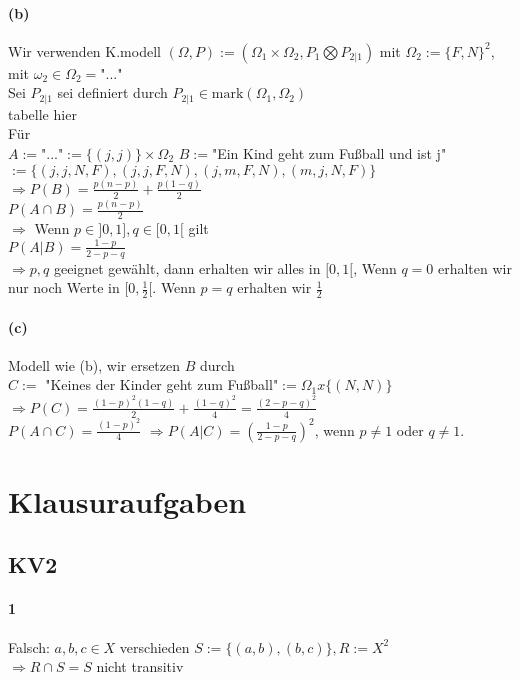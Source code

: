 \documentclass[10pt, a4paper]{article}
\begin{document}
\paragraph{(b)}
Wir verwenden K.modell $(\Omega,P):=(\Omega_{1}\times\Omega_{2}, P_{1}\bigotimes P_{2|1})$ mit $\Omega_{2}:=\{F,N\}^{2}$, mit $\omega_{2}\in\Omega_{2}\hat{=}$"..."	\\
Sei $P_{2|1}$ sei definiert durch $P_{2|1}\in\text{mark}(\Omega_{1},\Omega_{2})$	\\

tabelle hier	\\


Für	\\
$A:=$"..."$:=\{(j,j)\}\times\Omega_{2}$ 
$B:=$"Ein Kind geht zum Fußball und ist j"$:=\{(j,j,N,F),(j,j,F,N),(j,m,F,N),(m,j,N,F)\}$	\\
$\Rightarrow P(B)=\frac{p(n-p)}{2}+\frac{p(1-q)}{2}$	\\
$P(A\cap B)=\frac{p(n-p)}{2}$	\\
$\Rightarrow$ Wenn $p\in]0,1], q\in[0,1[$ gilt	\\
$P(A|B)=\frac{1-p}{2-p-q}$	\\
$\Rightarrow p,q$ geeignet gewählt, dann erhalten wir alles in $[0,1[$, Wenn $q=0$ erhalten wir nur noch Werte in $[0,\frac{1}{2}[$. Wenn $p=q$ erhalten wir $\frac{1}{2}$

\paragraph{(c)}
Modell wie (b), wir ersetzen $B$ durch \\
$C:=$ "Keines der Kinder geht zum Fußball"$:=\Omega_{1}x\{(N,N)\}$
$\Rightarrow P(C)=\frac{(1-p)^{2}(1-q)}{2}+\frac{(1-q)^{2}}{4}=\frac{(2-p-q)^{2}}{4}$	\\
$P(A\cap C)=\frac{(1-p)^{2}}{4}$
$\Rightarrow P(A|C)=(\frac{1-p}{2-p-q})^{2}$, wenn $p\neq1$ oder $q\neq1$.



\section{Klausuraufgaben}
\subsection{KV2}
\paragraph{1} Falsch: $a,b,c\in X$ verschieden $S:=\{(a,b),(b,c)\}, R:=X^{2}$	\\
$\Rightarrow R\cap S=S$ nicht transitiv
\end{document}
